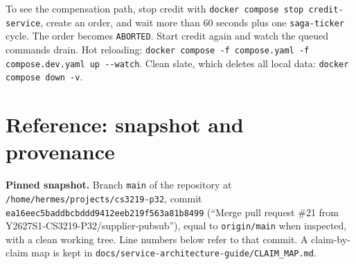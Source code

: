 \documentclass[11pt,a4paper]{article}
\newcommand{\code}[1]{\nolinkurl{#1}}
\begin{document}
To see the compensation path, stop credit with \code{docker compose stop credit-service},
create an order, and wait more than 60 seconds plus one \code{saga-ticker} cycle. The
order becomes \code{ABORTED}. Start credit again and watch the queued commands drain.
Hot reloading: \code{docker compose -f compose.yaml -f compose.dev.yaml up --watch}.
Clean slate, which deletes all local data: \code{docker compose down -v}.

\section{Reference: snapshot and provenance}
\label{app:refs}

\textbf{Pinned snapshot.} Branch \code{main} of the repository at
\code{/home/hermes/projects/cs3219-p32}, commit
\code{ea16eec5baddbcbddd9412eeb219f563a81b8499} (``Merge pull request \#21 from
Y2627S1-CS3219-P32/supplier-pubsub''), equal to \code{origin/main} when inspected, with a
clean working tree. Line numbers below refer to that commit. A claim-by-claim map is kept
in \code{docs/service-architecture-guide/CLAIM_MAP.md}.
\end{document}
